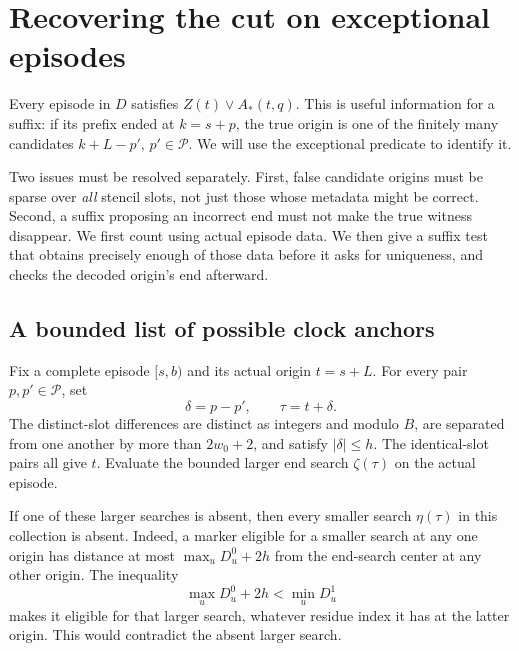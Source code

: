 \section{Recovering the cut on exceptional episodes}
\label{decode:section}

Every episode in $D$ satisfies $Z(t)\lor A_*(t,q)$. This is useful
information for a suffix: if its prefix ended at $k=s+p$, the true origin
is one of the finitely many candidates $k+L-p'$, $p'\in\mathcal P$.
We will use the exceptional predicate to identify it.

Two issues must be resolved separately. First, false candidate origins
must be sparse over \emph{all} stencil slots, not just those whose
metadata might be correct. Second, a suffix proposing an incorrect end
must not make the true witness disappear. We first count using actual
episode data. We then give a suffix test that obtains precisely enough
of those data before it asks for uniqueness, and checks the decoded
origin's end afterward.

\subsection{A bounded list of possible clock anchors}

Fix a complete episode $[s,b)$ and its actual origin $t=s+L$.
For every pair $p,p'\in\mathcal P$, set
\[
       \delta=p-p',\qquad \tau=t+\delta.
\]
The distinct-slot differences are distinct as integers and modulo
$B$, are separated from one another by more than $2w_0+2$, and
satisfy $|\delta|\le h$.  The identical-slot pairs all give $t$.
Evaluate the bounded larger end search $\zeta(\tau)$ on the
actual episode.

If one of these larger searches is absent, then every smaller
search $\eta(\tau)$ in this collection is absent.  Indeed, a
marker eligible for a smaller search at any one origin has
distance at most $\max_u D^0_u+2h$ from the end-search center at
any other origin.  The inequality
\begin{equation}
                 \max_u D^0_u+2h<\min_u D^1_u
 \label{decode:two-searches}
\end{equation}
makes it eligible for that larger search, whatever residue index
it has at the latter origin.  This would contradict the absent
larger search.

